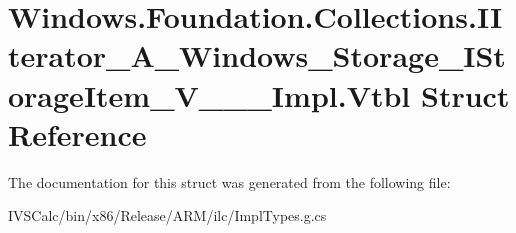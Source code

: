 \hypertarget{struct_windows_1_1_foundation_1_1_collections_1_1_i_iterator___a___windows___storage___i_storage_item___v_______impl_1_1_vtbl}{}\section{Windows.\+Foundation.\+Collections.\+I\+Iterator\+\_\+\+A\+\_\+\+Windows\+\_\+\+Storage\+\_\+\+I\+Storage\+Item\+\_\+\+V\+\_\+\+\_\+\+\_\+\+Impl.\+Vtbl Struct Reference}
\label{struct_windows_1_1_foundation_1_1_collections_1_1_i_iterator___a___windows___storage___i_storage_item___v_______impl_1_1_vtbl}


The documentation for this struct was generated from the following file\+:\begin{DoxyCompactItemize}
\item 
I\+V\+S\+Calc/bin/x86/\+Release/\+A\+R\+M/ilc/Impl\+Types.\+g.\+cs\end{DoxyCompactItemize}
